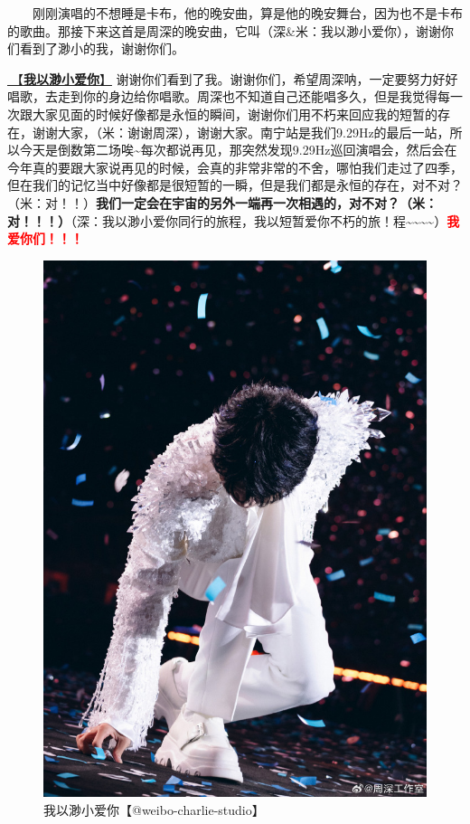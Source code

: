 \documentclass[]{ctexbook}
\begin{document}
  刚刚演唱的不想睡是卡布，他的晚安曲，算是他的晚安舞台，因为也不是卡布的歌曲。那接下来这首是周深的晚安曲，它叫（深\&米：我以渺小爱你），谢谢你们看到了渺小的我，谢谢你们。

\hyperref[loving-you-in-my-humble-way]{🎵【\textbf{我以渺小爱你}】} 谢谢你们看到了我。谢谢你们，希望周深呐，一定要努力好好唱歌，去走到你的身边给你唱歌。周深也不知道自己还能唱多久，但是我觉得每一次跟大家见面的时候好像都是永恒的瞬间，谢谢你们用不朽来回应我的短暂的存在，谢谢大家，（米：谢谢周深），谢谢大家。南宁站是我们9.29Hz的最后一站，所以今天是倒数第二场唉\textasciitilde 每次都说再见，那突然发现9.29Hz巡回演唱会，然后会在今年真的要跟大家说再见的时候，会真的非常非常的不舍，哪怕我们走过了四季，但在我们的记忆当中好像都是很短暂的一瞬，但是我们都是永恒的存在，对不对？（米：对！！）\textbf{我们一定会在宇宙的另外一端再一次相遇的，对不对？（米：对！！！）}（深：我以渺小爱你同行的旅程，我以短暂爱你不朽的旅！程\textasciitilde\textasciitilde\textasciitilde\textasciitilde）\textbf{\textcolor{red}{我爱你们！！！}}

\begin{figure}

{\centering \includegraphics[width=400pt]{img/nanning20241206/005} 

}

\caption{我以渺小爱你【@weibo-charlie-studio】}\label{fig:unnamed-chunk-156}
\end{figure}
\end{document}
